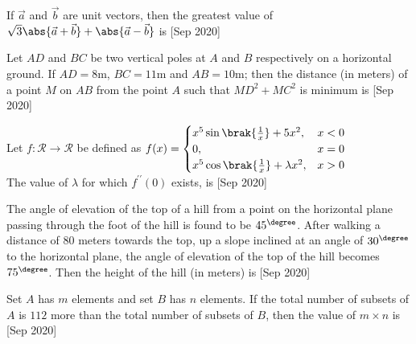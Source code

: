 \iffalse
    \title{2020}
    \author{AI24BTECH11030}
    \section{integer}
\fi

\item If $\vec{a}$ and $\vec{b}$ are unit vectors, then the greatest value of $\sqrt{3} \abs{\vec{a} + \vec{b}} + \abs{\vec{a} - \vec{b}}$ is \hfill [Sep 2020] \\
    
\item Let $AD$ and $BC$ be two vertical poles at $A$ and $B$ respectively on a horizontal ground. If $AD = 8\text{m}$, $BC = 11\text{m}$ and $AB = 10\text{m}$; then the distance (in meters) of a point $M$ on $AB$ from the point $A$ such that $MD^2+MC^2$ is minimum is \hfill [Sep 2020]

\item Let $f : \mathcal{R} \rightarrow \mathcal{R}$ be defined as $f(x)= \begin{cases}x^5\sin\brak{\frac{1}{x}} + 5x^2,& x < 0 \\
0,& x = 0\\
x^5\cos\brak{\frac{1}{x}} + \lambda x^2,& x > 0\end{cases}$\\

The value of $\lambda$ for which $f^{\prime\prime}(0)$ exists, is \hfill [Sep 2020] \\ 

\item The angle of elevation of the top of a hill from a point on the horizontal plane passing through the foot of the hill is found to be $45^{\degree}$. After walking a distance of $80$ meters towards the top, up a slope inclined at an angle of $30^{\degree}$ to the horizontal plane, the angle of elevation of the top of the hill becomes $75^{\degree}$. Then the height of the hill (in meters) is \hfill [Sep 2020] \\

\item Set $A$ has $m$ elements and set $B$ has $n$ elements. If the total number of subsets of $A$ is $112$ more than the total number of subsets of $B$, then the value of $m\times n$ is \hfill [Sep 2020]
